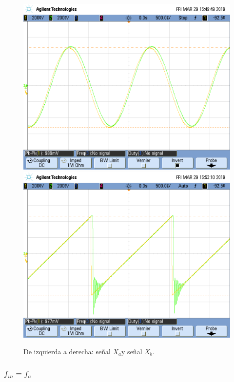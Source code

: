 \documentclass[../../ASSD_TP1_G7.tex]{subfiles}
\begin{document}
\begin{figure}[H]

\begin{centering}
\includegraphics[scale=0.25]{Imagenes/syh_pto_bsin}\includegraphics[scale=0.25]{Imagenes/syh_pto_bcuad_1}\caption{De izquierda a derecha: señal $X_{a}$y señal $X_{b}$.}
\par\end{centering}
\end{figure}


\subsubsection{$f_{in}=f_{a}$}
\end{document}
